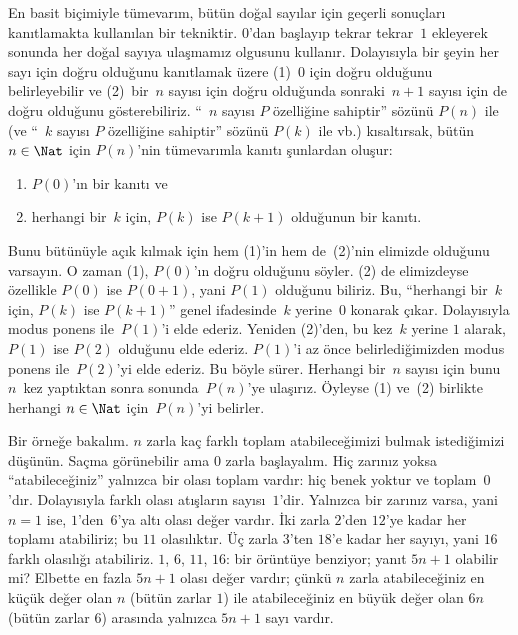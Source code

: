 



En basit biçimiyle tümevarım, bütün doğal sayılar için geçerli
sonuçları kanıtlamakta kullanılan bir tekniktir. $0$'dan başlayıp
tekrar tekrar~$1$ ekleyerek sonunda her doğal sayıya ulaşmamız olgusunu
kullanır. Dolayısıyla bir şeyin her sayı için doğru olduğunu kanıtlamak
üzere (1)~$0$ için doğru olduğunu belirleyebilir ve (2)~bir~$n$ sayısı
için doğru olduğunda sonraki~$n+1$ sayısı için de doğru olduğunu
gösterebiliriz. ``~$n$ sayısı $P$ özelliğine sahiptir'' sözünü $P(n)$
ile (ve ``~$k$ sayısı $P$ özelliğine sahiptir'' sözünü $P(k)$ ile vb.)
kısaltırsak, bütün $n \in \Nat$ için $P(n)$'nin tümevarımla kanıtı
şunlardan oluşur:
\begin{enumerate}
\item $P(0)$'ın bir kanıtı ve
\item herhangi bir~$k$ için, $P(k)$ ise $P(k+1)$ olduğunun bir kanıtı.
\end{enumerate}
Bunu bütünüyle açık kılmak için hem (1)'in hem de~(2)'nin elimizde
olduğunu varsayın. O zaman (1), $P(0)$'ın doğru olduğunu söyler. (2) de
elimizdeyse özellikle $P(0)$ ise $P(0+1)$, yani $P(1)$ olduğunu biliriz.
Bu, ``herhangi bir~$k$ için, $P(k)$ ise $P(k+1)$'' genel ifadesinde~$k$
yerine~$0$ konarak çıkar. Dolayısıyla modus ponens ile~$P(1)$'i elde
ederiz. Yeniden (2)'den, bu kez~$k$ yerine $1$ alarak, $P(1)$ ise
$P(2)$ olduğunu elde ederiz. $P(1)$'i az önce belirlediğimizden modus
ponens ile~$P(2)$'yi elde ederiz. Bu böyle sürer. Herhangi bir~$n$
sayısı için bunu $n$~kez yaptıktan sonra sonunda~$P(n)$'ye ulaşırız.
Öyleyse (1) ve~(2) birlikte herhangi $n \in \Nat$ için~$P(n)$'yi
belirler.

Bir örneğe bakalım. $n$ zarla kaç farklı toplam atabileceğimizi bulmak
istediğimizi düşünün. Saçma görünebilir ama $0$ zarla başlayalım. Hiç
zarınız yoksa ``atabileceğiniz'' yalnızca bir olası toplam vardır: hiç
benek yoktur ve toplam~$0$'dır. Dolayısıyla farklı olası atışların
sayısı~$1$'dir. Yalnızca bir zarınız varsa, yani $n=1$ ise, $1$'den~$6$'ya
altı olası değer vardır. İki zarla $2$'den $12$'ye kadar her toplamı
atabiliriz; bu $11$ olasılıktır. Üç zarla $3$'ten $18$'e kadar her
sayıyı, yani $16$ farklı olasılığı atabiliriz. $1$, $6$, $11$, $16$:
  bir örüntüye benziyor; yanıt $5n+1$ olabilir mi? Elbette en fazla
  $5n+1$ olası değer vardır; çünkü $n$ zarla atabileceğiniz en küçük değer olan
$n$ (bütün zarlar $1$) ile atabileceğiniz en büyük değer olan $6n$
(bütün zarlar $6$) arasında yalnızca $5n+1$ sayı vardır.

